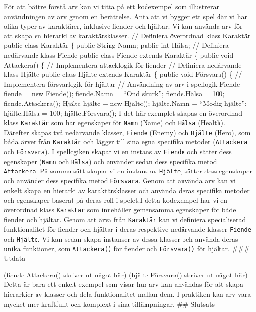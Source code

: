 För att bättre förstå arv kan vi titta på ett kodexempel som illustrerar
användningen av arv genom en berättelse. Anta att vi bygger ett spel där
vi har olika typer av karaktärer, inklusive fiender och hjältar. Vi kan
använda arv för att skapa en hierarki av karaktärsklasser. // Definiera
överordnad klass Karaktär public class Karaktär \{ public String Namn;
public int Hälsa; // Definiera nedärvande klass Fiende public class
Fiende extends Karaktär \{ public void Attackera() \{ // Implementera
attacklogik för fiender // Definiera nedärvande klass Hjälte public
class Hjälte extends Karaktär \{ public void Försvara() \{ //
Implementera försvarlogik för hjältar // Användning av arv i spellogik
Fiende fiende = new Fiende(); fiende.Namn = ``Ond skurk''; fiende.Hälsa
= 100; fiende.Attackera(); Hjälte hjälte = new Hjälte(); hjälte.Namn =
``Modig hjälte''; hjälte.Hälsa = 100; hjälte.Försvara(); I det här
exemplet skapas en överordnad klass \texttt{Karaktär} som har egenskaper
för \texttt{Namn} (Name) och \texttt{Hälsa} (Health). Därefter skapas
två nedärvande klasser, \texttt{Fiende} (Enemy) och \texttt{Hjälte}
(Hero), som båda ärver från \texttt{Karaktär} och lägger till sina egna
specifika metoder (\texttt{Attackera} och \texttt{Försvara}). I
spellogiken skapar vi en instans av \texttt{Fiende} och sätter dess
egenskaper (\texttt{Namn} och \texttt{Hälsa}) och använder sedan dess
specifika metod \texttt{Attackera}. På samma sätt skapar vi en instans
av \texttt{Hjälte}, sätter dess egenskaper och använder dess specifika
metod \texttt{Försvara}. Genom att använda arv kan vi enkelt skapa en
hierarki av karaktärsklasser och använda deras specifika metoder och
egenskaper baserat på deras roll i spelet.I detta kodexempel har vi en
överordnad klass \texttt{Karaktär} som innehåller gemensamma egenskaper
för både fiender och hjältar. Genom att ärva från \texttt{Karaktär} kan
vi definiera specialiserad funktionalitet för fiender och hjältar i
deras respektive nedärvande klasser \texttt{Fiende} och \texttt{Hjälte}.
Vi kan sedan skapa instanser av dessa klasser och använda deras unika
funktioner, som \texttt{Attackera()} för fiender och \texttt{Försvara()}
för hjältar. \#\#\# Utdata

(fiende.Attackera() skriver ut något här) (hjälte.Försvara() skriver ut
något här) Detta är bara ett enkelt exempel som visar hur arv kan
användas för att skapa hierarkier av klasser och dela funktionalitet
mellan dem. I praktiken kan arv vara mycket mer kraftfullt och komplext
i sina tillämpningar. \#\# Slutsats


